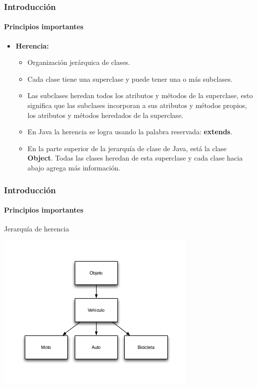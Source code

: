 \documentclass{beamer}
\begin{document}
		\begin{frame}
			\frametitle{Introducci\'on}
			\framesubtitle{Principios importantes}

			\begin{itemize}
				\item \textbf{Herencia:}
				\begin{itemize}
  					\item Organizaci\'on jer\'arquica de clases.
					\item Cada clase tiene una superclase y puede tener una o m\'as subclases. 
					\item Las subclases heredan todos los atributos y m\'etodos de la superclase, esto significa que las subclases incorporan a sus atributos y m\'etodos propios, los atributos y m\'etodos heredados de la superclase.
					\item En Java la herencia se logra usando la palabra reservada: \textbf{extends}. 
					\item En la parte superior de la jerarqu\'ia de clase de Java, est\'a la clase \textbf{Object}. Todas las clases heredan de esta superclase y cada clase hacia abajo agrega m\'as informaci\'on.
				\end{itemize}
			\end{itemize}
		\end{frame}

		\begin{frame}
			\frametitle{Introducci\'on}
			\framesubtitle{Principios importantes}

			\begin{exampleblock}{Jerarqu\'ia de herencia}
				\begin{center}
					\includegraphics[scale=.5]{images/jerarquia_1.png}
				\end{center}
			\end{exampleblock}
		\end{frame}
\end{document}

